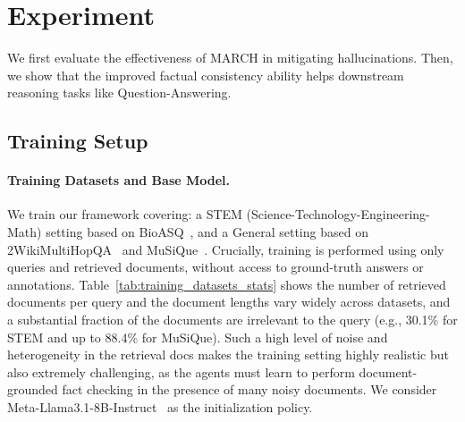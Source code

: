 \documentclass[10pt, a4paper, logo]{googledeepmind} %
\begin{document}
\section{Experiment}
We first evaluate the effectiveness of MARCH in mitigating hallucinations.
Then, we show that the improved factual consistency ability helps downstream reasoning tasks like Question-Answering.
\subsection{Training Setup}
\paragraph{Training Datasets and Base Model.}
We train our framework covering: a {STEM} (Science-Technology-Engineering-Math) setting based on BioASQ~\citep{krithara2023bioasq}, and a {General} setting based on 2WikiMultiHopQA~\citep{ho2020constructing} and MuSiQue~\citep{trivedi2022musique}. Crucially, training is performed using only queries and retrieved documents, without access to ground-truth answers or annotations. Table~\ref{tab:training_datasets_stats} shows the number of retrieved documents per query and the document lengths vary widely across datasets, and a substantial fraction of the documents are irrelevant to the query (e.g., 30.1\% for STEM and up to 88.4\% for MuSiQue). Such a high level of noise and heterogeneity in the retrieval docs makes the training setting highly realistic but also extremely challenging, as the agents must learn to perform document-grounded fact checking in the presence of many noisy documents. We consider Meta-Llama3.1-8B-Instruct~\citep{touvron2023llamaopenefficientfoundation} as the initialization policy.
\end{document}
